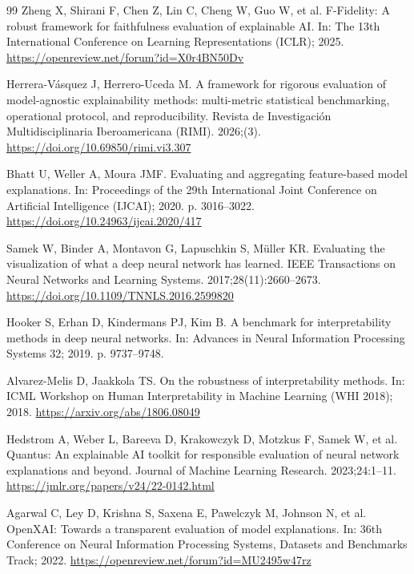 \documentclass[11pt,a4paper]{article}
\begin{document}
\begin{thebibliography}{99}
Zheng X, Shirani F, Chen Z, Lin C, Cheng W, Guo W, et al. F-Fidelity: A
robust framework for faithfulness evaluation of explainable AI. In: The 13th
International Conference on Learning Representations (ICLR); 2025.
\url{https://openreview.net/forum?id=X0r4BN50Dv}

Herrera-V\'asquez J, Herrero-Uceda M. A framework for rigorous evaluation of
model-agnostic explainability methods: multi-metric statistical benchmarking,
operational protocol, and reproducibility. Revista de Investigaci\'on
Multidisciplinaria Iberoamericana (RIMI). 2026;(3).
\url{https://doi.org/10.69850/rimi.vi3.307}

Bhatt U, Weller A, Moura JMF. Evaluating and aggregating feature-based model
explanations. In: Proceedings of the 29th International Joint Conference on
Artificial Intelligence (IJCAI); 2020. p. 3016--3022.
\url{https://doi.org/10.24963/ijcai.2020/417}

Samek W, Binder A, Montavon G, Lapuschkin S, M\"{u}ller KR. Evaluating the
visualization of what a deep neural network has learned. IEEE Transactions on
Neural Networks and Learning Systems. 2017;28(11):2660--2673.
\url{https://doi.org/10.1109/TNNLS.2016.2599820}

Hooker S, Erhan D, Kindermans PJ, Kim B. A benchmark for interpretability
methods in deep neural networks. In: Advances in Neural Information
Processing Systems 32; 2019. p. 9737--9748.

Alvarez-Melis D, Jaakkola TS. On the robustness of interpretability methods.
In: ICML Workshop on Human Interpretability in Machine Learning (WHI 2018);
2018. \url{https://arxiv.org/abs/1806.08049}

Hedstrom A, Weber L, Bareeva D, Krakowczyk D, Motzkus F, Samek W, et al.
Quantus: An explainable AI toolkit for responsible evaluation of neural
network explanations and beyond. Journal of Machine Learning Research.
2023;24:1--11. \url{https://jmlr.org/papers/v24/22-0142.html}

Agarwal C, Ley D, Krishna S, Saxena E, Pawelczyk M, Johnson N, et al.
OpenXAI: Towards a transparent evaluation of model explanations. In: 36th
Conference on Neural Information Processing Systems, Datasets and Benchmarks
Track; 2022. \url{https://openreview.net/forum?id=MU2495w47rz}


\end{thebibliography}
\end{document}
